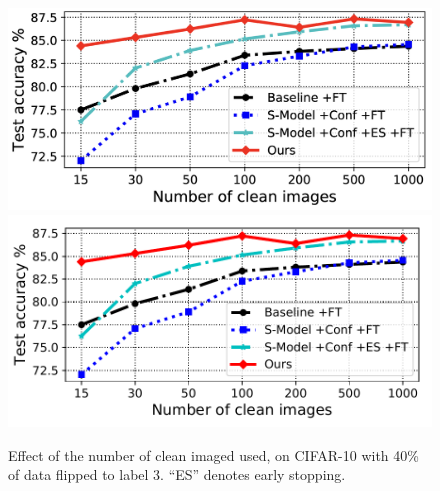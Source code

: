 
\begin{figure}[t]
\centering
\iflatexml
\includegraphics[width=6\columnwidth]{figures/cifar-imbalance-ft.png}
\else
\includegraphics[width=0.9\columnwidth]{figures/cifar-imbalance-ft.pdf}
\fi
\vspace{-0.1in}
\caption{Effect of the number of clean imaged used, on CIFAR-10 with 40\% of data flipped to label 3. ``ES'' denotes early stopping.}
\label{fig:ft}
\end{figure}
